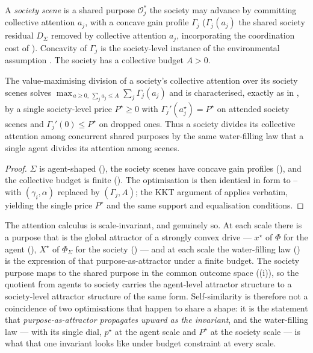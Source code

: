 \documentclass[11pt,twocolumn,a4paper]{article}
\newcommand{\drive}{\Phi}            %
\newcommand{\Purp}{x^{\star}}        %
\newcommand{\att}{\alpha}            %
\newcommand{\price}{p^{\star}}       %
\newcommand{\Soc}{\Sigma}            %
\newcommand{\Out}{\mathcal{O}}       %
\begin{document}
\begin{definition}
\label{def:socscene}
A \emph{society scene} is a shared purpose $\Out^\ast_j$ the society may
advance by committing collective attention $a_j$, with a concave gain
profile $\Gamma_j$ ($\Gamma_j(a_j)$ the shared society residual $D_\Soc$
removed by collective attention $a_j$, incorporating the coordination cost
of ). Concavity of $\Gamma_j$ is the society-level
instance of the environmental assumption . The society has
a collective budget $A>0$.
\end{definition}

\begin{theorem}
\label{thm:socwaterfill}
The value-maximising division of a society's collective attention over its
society scenes solves $\max_{\,a\ge0,\ \sum_j a_j\le A}\sum_j\Gamma_j(a_j)$
and is characterised, exactly as in , by a single
society-level price $P^\star\ge0$ with $\Gamma_j'(a_j^\star)=P^\star$ on
attended society scenes and $\Gamma_j'(0)\le P^\star$ on dropped ones.
Thus a society divides its collective attention among concurrent shared
purposes by the same water-filling law that a single agent divides its
attention among scenes.
\end{theorem}

\begin{proof}
$\Soc$ is agent-shaped (), the society scenes have
concave gain profiles (), and the collective budget is
finite (). The optimisation is then identical in form
to -- with $(\gamma_i,\att)$ replaced
by $(\Gamma_j,A)$; the KKT argument of  applies
verbatim, yielding the single price $P^\star$ and the same support and
equalisation conditions.
\end{proof}

\begin{corollary}
\label{cor:selfsim}
The attention calculus is scale-invariant, and genuinely so. At each scale
there is a purpose that is the global attractor of a strongly convex drive
--- $\Purp$ of $\drive$ for the agent (), $X^\star$ of
$\drive_\Soc$ for the society () --- and at each
scale the water-filling law () is the
expression of that purpose-as-attractor under a finite budget. The society
purpose maps to the shared purpose in the common outcome space
((i)), so the quotient from agents to society
carries the agent-level attractor structure to a society-level attractor
structure of the same form. Self-similarity is therefore not a coincidence
of two optimisations that happen to share a shape: it is the statement that
\emph{purpose-as-attractor propagates upward as the invariant}, and the
water-filling law --- with its single dial, $\price$ at the agent scale and
$P^\star$ at the society scale --- is what that one invariant looks like
under budget constraint at every scale.
\end{corollary}
\end{document}

